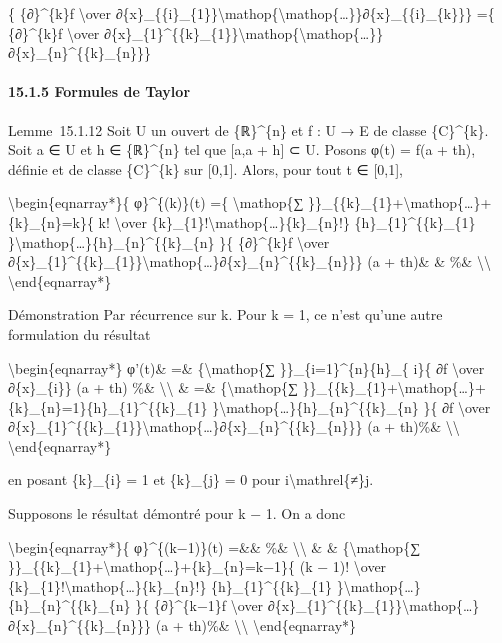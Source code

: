 \documentclass[]{article}
\begin{document}
\{ \{∂\}\^{}\{k\}f \textbackslash{}over
∂\{x\}\_\{\{i\}\_\{1\}\}\textbackslash{}mathop\{\textbackslash{}mathop\{\ldots{}\}\}∂\{x\}\_\{\{i\}\_\{k\}\}\}
=\{ \{∂\}\^{}\{k\}f \textbackslash{}over
∂\{x\}\_\{1\}\^{}\{\{k\}\_\{1\}\}\textbackslash{}mathop\{\textbackslash{}mathop\{\ldots{}\}\}∂\{x\}\_\{n\}\^{}\{\{k\}\_\{n\}\}\}

\paragraph{15.1.5 Formules de Taylor}

Lemme~15.1.12 Soit U un ouvert de \{ℝ\}\^{}\{n\} et f : U → E de classe
\{C\}\^{}\{k\}. Soit a ∈ U et h ∈ \{ℝ\}\^{}\{n\} tel que {[}a,a + h{]} ⊂
U. Posons φ(t) = f(a + th), définie et de classe \{C\}\^{}\{k\} sur
{[}0,1{]}. Alors, pour tout t ∈ {[}0,1{]},

\textbackslash{}begin\{eqnarray*\}\{ φ\}\^{}\{(k)\}(t) =\{
\textbackslash{}mathop\{∑
\}\}\_\{\{k\}\_\{1\}+\textbackslash{}mathop\{\ldots{}\}+\{k\}\_\{n\}=k\}\{
k! \textbackslash{}over
\{k\}\_\{1\}!\textbackslash{}mathop\{\ldots{}\}\{k\}\_\{n\}!\}
\{h\}\_\{1\}\^{}\{\{k\}\_\{1\}
\}\textbackslash{}mathop\{\ldots{}\}\{h\}\_\{n\}\^{}\{\{k\}\_\{n\} \}\{
\{∂\}\^{}\{k\}f \textbackslash{}over
∂\{x\}\_\{1\}\^{}\{\{k\}\_\{1\}\}\textbackslash{}mathop\{\ldots{}\}∂\{x\}\_\{n\}\^{}\{\{k\}\_\{n\}\}\}
(a + th)\& \& \%\& \textbackslash{}\textbackslash{}
\textbackslash{}end\{eqnarray*\}

Démonstration Par récurrence sur k. Pour k = 1, ce n'est qu'une autre
formulation du résultat

\textbackslash{}begin\{eqnarray*\} φ'(t)\& =\&
\{\textbackslash{}mathop\{∑ \}\}\_\{i=1\}\^{}\{n\}\{h\}\_\{ i\}\{ ∂f
\textbackslash{}over ∂\{x\}\_\{i\}\} (a + th) \%\&
\textbackslash{}\textbackslash{} \& =\& \{\textbackslash{}mathop\{∑
\}\}\_\{\{k\}\_\{1\}+\textbackslash{}mathop\{\ldots{}\}+\{k\}\_\{n\}=1\}\{h\}\_\{1\}\^{}\{\{k\}\_\{1\}
\}\textbackslash{}mathop\{\ldots{}\}\{h\}\_\{n\}\^{}\{\{k\}\_\{n\} \}\{
∂f \textbackslash{}over
∂\{x\}\_\{1\}\^{}\{\{k\}\_\{1\}\}\textbackslash{}mathop\{\ldots{}\}∂\{x\}\_\{n\}\^{}\{\{k\}\_\{n\}\}\}
(a + th)\%\& \textbackslash{}\textbackslash{}
\textbackslash{}end\{eqnarray*\}

en posant \{k\}\_\{i\} = 1 et \{k\}\_\{j\} = 0 pour
i\textbackslash{}mathrel\{≠\}j.

Supposons le résultat démontré pour k − 1. On a donc

\textbackslash{}begin\{eqnarray*\}\{ φ\}\^{}\{(k−1)\}(t) =\&\& \%\&
\textbackslash{}\textbackslash{} \& \& \{\textbackslash{}mathop\{∑
\}\}\_\{\{k\}\_\{1\}+\textbackslash{}mathop\{\ldots{}\}+\{k\}\_\{n\}=k−1\}\{
(k − 1)! \textbackslash{}over
\{k\}\_\{1\}!\textbackslash{}mathop\{\ldots{}\}\{k\}\_\{n\}!\}
\{h\}\_\{1\}\^{}\{\{k\}\_\{1\}
\}\textbackslash{}mathop\{\ldots{}\}\{h\}\_\{n\}\^{}\{\{k\}\_\{n\} \}\{
\{∂\}\^{}\{k−1\}f \textbackslash{}over
∂\{x\}\_\{1\}\^{}\{\{k\}\_\{1\}\}\textbackslash{}mathop\{\ldots{}\}∂\{x\}\_\{n\}\^{}\{\{k\}\_\{n\}\}\}
(a + th)\%\& \textbackslash{}\textbackslash{}
\textbackslash{}end\{eqnarray*\}
\end{document}
